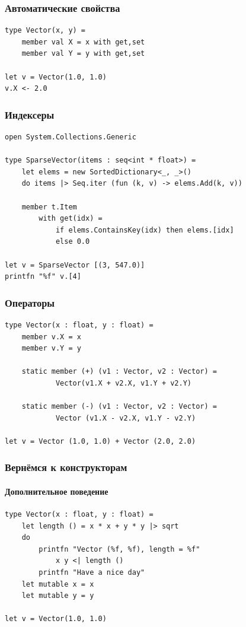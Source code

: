 \documentclass{../../slides-style}
\begin{document}
    \begin{frame}[fragile]
        \frametitle{Автоматические свойства}
        \begin{verbatim}
type Vector(x, y) = 
    member val X = x with get,set
    member val Y = y with get,set

let v = Vector(1.0, 1.0)
v.X <- 2.0
        \end{verbatim}
    \end{frame}

    \begin{frame}[fragile]
        \frametitle{Индексеры}
        \begin{verbatim}
open System.Collections.Generic

type SparseVector(items : seq<int * float>) =
    let elems = new SortedDictionary<_, _>()
    do items |> Seq.iter (fun (k, v) -> elems.Add(k, v))

    member t.Item
        with get(idx) =
            if elems.ContainsKey(idx) then elems.[idx]
            else 0.0

let v = SparseVector [(3, 547.0)]
printfn "%f" v.[4]
        \end{verbatim}
    \end{frame}

    \begin{frame}[fragile]
        \frametitle{Операторы}
        \begin{verbatim}
type Vector(x : float, y : float) =
    member v.X = x
    member v.Y = y

    static member (+) (v1 : Vector, v2 : Vector) =
            Vector(v1.X + v2.X, v1.Y + v2.Y)

    static member (-) (v1 : Vector, v2 : Vector) =
            Vector (v1.X - v2.X, v1.Y - v2.Y)

let v = Vector (1.0, 1.0) + Vector (2.0, 2.0)
        \end{verbatim}
    \end{frame}

    \begin{frame}[fragile]
        \frametitle{Вернёмся к конструкторам}
        \framesubtitle{Дополнительное поведение}
        \begin{verbatim}
type Vector(x : float, y : float) = 
    let length () = x * x + y * y |> sqrt
    do 
        printfn "Vector (%f, %f), length = %f" 
            x y <| length ()
        printfn "Have a nice day"
    let mutable x = x
    let mutable y = y

let v = Vector(1.0, 1.0)
        \end{verbatim}
    \end{frame}
\end{document}
